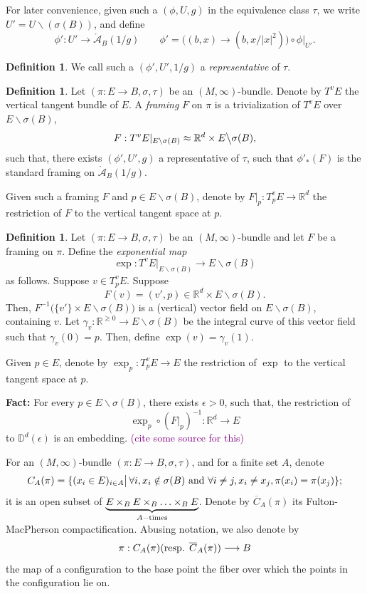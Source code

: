 \documentclass[11pt]{article}
\theoremstyle{definition}
\newtheorem{dfn}[thm]{Definition}
\theoremstyle{remark}
\def\ov#1{\overline{#1}}
\def\mr#1{{\mathring{#1}}}
\def\R{\mathbb{R}}
\def\D{\mathbb{D}}
\def\cA{\mathcal{A}}
\def\cmt#1{\textcolor{purple}{(#1)}}
\def\tn#1{\textnormal{#1}}
\begin{document}
For later convenience, given such a $(\phi,U,g)$ in the equivalence class $\tau$, we write $U'=U\backslash(\sigma(B))$, and define 
$$\phi': U'\to\mr\cA_B(1/g)\qquad \phi'=\big((b,x)\to (b,x/|x|^2)\big)\circ\phi|_{U'}.$$
\begin{dfn}
We call such a $(\phi',U',1/g)$ a {\it representative} of $\tau$. 
\end{dfn}

\begin{dfn}
Let $(\pi:E\to B,\sigma,\tau)$ be an $(M,\infty)$-bundle. 
Denote by $T^vE$ the vertical tangent bundle of $E$. 
A {\it framing} $F$ on $\pi$ is a trivialization of $T^vE$ over $E\backslash\sigma(B)$, 
$$F: T^vE|_{E\backslash\sigma(B)}\approx\R^d\times E\big\backslash\sigma(B),$$ 
such that, there exists $(\phi',U',g)$ a representative of $\tau$, such that $\phi'_*(F)$ is the standard framing on $\mr\cA_B(1/g)$. 
\end{dfn}

Given such a framing $F$ and $p\in E\backslash\sigma(B)$, denote by $F|_p:T^v_pE\to\R^d$ the restriction of $F$ to the vertical tangent space at $p$. 

\begin{dfn}
Let $(\pi:E\to B,\sigma,\tau)$ be an $(M,\infty)$-bundle and let $F$ be a framing on $\pi$. 
Define the {\it exponential map}
$$\exp: T^vE|_{E\backslash\sigma(B)}\to E\backslash\sigma(B)$$
as follows. 
Suppose $v\in T^v_pE$. Suppose 
$$F(v)=(v', p)\in \R^d\times E\backslash \sigma(B).$$
Then, $F^{-1}\big(\{v'\}\times E\backslash \sigma(B)\big)$ is a (vertical) vector field on $E\backslash\sigma(B)$, containing $v$. 
Let $\gamma_v:\R^{\ge0}\to E\backslash\sigma(B)$ be the integral curve of this vector field such that $\gamma_v(0)=p$. 
Then, define $\exp(v)=\gamma_v(1)$. 

Given $p\in E$, denote by $\exp_p:T^v_pE\to E$ the restriction of $\exp$ to the vertical tangent space at $p$. 

\end{dfn}



{\bf Fact:} For every $p\in E\backslash\sigma(B)$, there exists $\epsilon>0$, such that, the restriction of 
$$\exp_p\circ (F|_p)^{-1}:\R^d\longrightarrow E$$
to $\D^d(\epsilon)$ is an embedding. 
\cmt{cite some source for this}



For an $(M,\infty)$-bundle $(\pi:E\to B,\sigma,\tau)$, and for a finite set $A$, denote 
$$C_A(\pi)=\{(x_i\in E)_{i\in A}\big|\,\forall i, x_i\notin\sigma(B)\tn{ and }\forall i\neq j,x_i\neq x_j, \pi(x_i)=\pi(x_j) \};$$
it is an open subset of
$\underbrace{E\times_{B}E\times_B\ldots\times_BE}_{A-\tn{times}}$. 
Denote by $\ov{C}_A(\pi)$ its Fulton-MacPherson compactification. 
Abusing notation, we also denote by 
$$\pi:C_A(\pi) (\tn{resp. }\ov{C}_A(\pi)) \longrightarrow B$$
the map of a configuration to the base point the fiber over which the points in the configuration lie on. 
\end{document}
